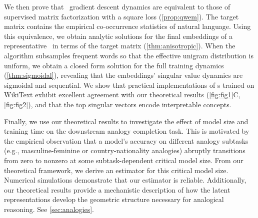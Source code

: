 We then prove that \wem\ gradient descent dynamics are equivalent to those of supervised matrix factorization with a square loss (\cref{prop:qwem}).
The target matrix contains the empirical co-occurrence statistics of natural language.
Using this equivalence, we obtain analytic solutions for the final embeddings of a representative \wem\ in terms of the target matrix (\cref{thm:anisotropic}).
When the algorithm subsamples frequent words so that the effective unigram distribution is uniform, we obtain a closed form solution for the full training dynamics (\cref{thm:sigmoidal}), revealing that the embeddings' singular value dynamics are sigmoidal and sequential.
We show that practical implementations of \wem s trained on WikiText exhibit excellent agreement with our theoretical results (\cref{fig:fig1}C, \cref{fig:fig2}), and that the top singular vectors encode interpretable concepts.

Finally, we use our theoretical results to investigate the effect of model size and training time on the downstream analogy completion task.
This is motivated by the empirical observation that a model's accuracy on different analogy subtasks (e.g., masculine-feminine or country-nationality analogies) abruptly transitions from zero to nonzero at some subtask-dependent critical model size.
From our theoretical framework, we derive an estimator for this critical model size.
Numerical simulations demonstrate that our estimator is reliable.
Additionally, our theoretical results provide a mechanistic description of how the latent representations develop the geometric structure necessary for analogical reasoning.
See \cref{sec:analogies}.

\clearpage
